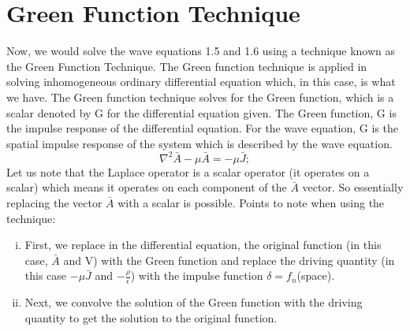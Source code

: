 \chapter{Green Function Technique}
Now, we would solve the wave equations 1.5 and 1.6 using a technique known as the Green Function Technique. The Green function technique is applied in solving inhomogeneous ordinary differential equation which, in this case, is what we have. The Green function technique solves for the Green function, which is a scalar denoted by G for the differential equation given. The Green function, G is the impulse response of the differential equation. For the wave equation, G is the spatial impulse response of the system which is described by the wave equation. 
$$\nabla^{2}\bar{A}-\mu\bar{A} = -\mu\bar{J};$$
Let us note that the Laplace operator is a scalar operator (it operates on a scalar) which means it operates on each component of the $\bar{A}$ vector. So essentially replacing the vector $\bar{A}$ with a scalar is possible.
Points to note when using the technique:
\begin{enumerate}[(i)]
\item First, we replace in the differential equation, the original function (in this case, $\bar{A}$ and V) with the Green function and replace the driving quantity (in this case $-\mu\bar{J}$ and $-\frac{\rho}{\epsilon}$) with the impulse function $\delta = f_{n}$(space).
\item Next, we convolve the solution of the Green function with the driving quantity to get the solution to the original function.
\end{enumerate}
 
